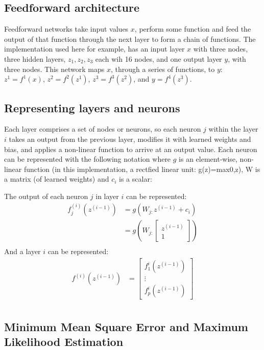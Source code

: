 \documentclass{article}
\begin{document}
\subsection{Feedforward architecture}
\label{ssec:feed}

Feedforward networks take input values $x$, perform some function and feed the output of that function through the next layer to form a chain of functions.  The implementation used here for example, has an input layer $x$ with three nodes, three hidden layers, $z_1, z_2, z_3$ each wih 16 nodes, and one output layer $y$, with three nodes.  This network maps $x$, through a series of functions, to $y$:
$z^1 = f^1(x)$, $z^2 = f^2(z^1)$, $z^3 = f^3(z^2)$, and $y = f^4(z^3)$. %
%
\subsection{Representing layers and neurons}
\label{ssec:represent}

Each layer comprises a set of nodes or neurons, so each neuron $j$ within the layer $i$ takes an output from the previous layer, modifies it with learned weights and bias, and applies a non-linear function to arrive at an output value.  Each neuron can be represented with the following notation where $g$ is an element-wise, non-linear function (in this implementation, a rectfied linear unit: g(z)=max{0,z}), W is a matrix (of learned weights) and $c_i$ is a scalar:  

The output of each neuron $j$ in layer $i$ can be represented:  
$$
\begin {aligned}
f_j^{(i)}(z^{(i-1)}) & = g(W_{j:}z^{(i-1)} + c_i)\\
  & = g(W_{j:} 
  \begin{bmatrix}
  z^{(i-1)}\\
  1
  \end{bmatrix} )\\
\end {aligned}
$$
And a layer $i$ can be represented:  
$$
\begin{aligned}
f^{(i)}(z^{(i-1)}) & =   
  \begin{bmatrix}
  f_1^{i}(z^{(i-1)})\\
  \vdots \\
  f_p^{i}(z^{(i-1)})
  \end{bmatrix}\\
\end{aligned}
$$

\subsection{Minimum Mean Square Error and Maximum Likelihood Estimation}
\label{sec:MMSEMLE}
\end{document}
